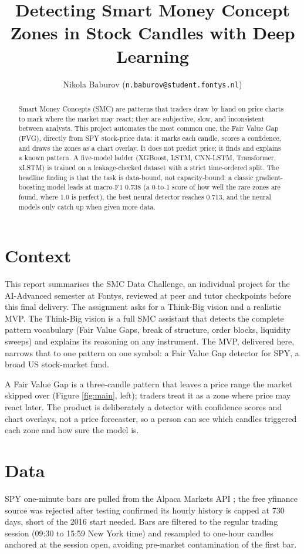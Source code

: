 \documentclass[10pt, twocolumn, letterpaper]{article}
\title{\vspace{-1ex}\large\textbf{Detecting Smart Money Concept Zones in Stock Candles with Deep Learning}\vspace{-1ex}}
\author{
    \small Nikola Baburov (\texttt{n.baburov@student.fontys.nl})
}
\date{\vspace{-2ex}}
\begin{document}
\maketitle

\begin{abstract}
Smart Money Concepts (SMC) are patterns that traders draw by hand on price charts to mark where the market may react; they are subjective, slow, and inconsistent between analysts. This project automates the most common one, the Fair Value Gap (FVG), directly from SPY stock-price data: it marks each candle, scores a confidence, and draws the zones as a chart overlay. It does not predict price; it finds and explains a known pattern. A five-model ladder (XGBoost, LSTM, CNN-LSTM, Transformer, xLSTM) is trained on a leakage-checked dataset with a strict time-ordered split. The headline finding is that the task is data-bound, not capacity-bound: a classic gradient-boosting model leads at macro-F1 0.738 (a 0-to-1 score of how well the rare zones are found, where 1.0 is perfect), the best neural detector reaches 0.713, and the neural models only catch up when given more data.
\end{abstract}

\section{Context}
This report summarises the SMC Data Challenge, an individual project for the AI-Advanced semester at Fontys, reviewed at peer and tutor checkpoints before this final delivery. The assignment asks for a Think-Big vision and a realistic MVP. The Think-Big vision is a full SMC assistant that detects the complete pattern vocabulary (Fair Value Gaps, break of structure, order blocks, liquidity sweeps) and explains its reasoning on any instrument. The MVP, delivered here, narrows that to one pattern on one symbol: a Fair Value Gap detector for SPY, a broad US stock-market fund.

A Fair Value Gap is a three-candle pattern that leaves a price range the market skipped over (Figure \ref{fig:main}, left); traders treat it as a zone where price may react later. The product is deliberately a detector with confidence scores and chart overlays, not a price forecaster, so a person can see which candles triggered each zone and how sure the model is.

\section{Data}
SPY one-minute bars are pulled from the Alpaca Markets API \cite{alpaca}; the free yfinance source was rejected after testing confirmed its hourly history is capped at 730 days, short of the 2016 start needed. Bars are filtered to the regular trading session (09:30 to 15:59 New York time) and resampled to one-hour candles anchored at the session open, avoiding pre-market contamination of the first bar.
\end{document}
